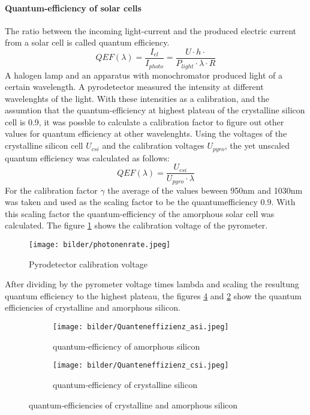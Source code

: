 \paragraph{Quantum-efficiency of solar cells}
The ratio between the incoming light-current and the produced
electric current from a solar cell is called quantum efficiency.
\begin{equation}
  QEF(\lambda) = \frac{I_{el}}{I_{photo}} = \frac{U\cdot h \cdot}{P_{light} \cdot \lambda \cdot R}
\end{equation}
A halogen lamp and an apparatus with monochromator produced light of a certain wavelength.
A pyrodetector measured the intensity at different wavelenghts of the light. With these intensities as
a calibration, and the assumtion that the quantum-efficiency
at highest plateau of the crystalline silicon cell is 0.9, it was possble to calculate a calibration factor
to figure out other values for quantum efficiency at other wavelenghts.
Using the voltages of the crystalline silicon cell $U_{csi}$ and the calibration voltages $U_{pyro}$, the yet unscaled quantum efficiency was calculated as follows:
\begin{equation}
  QEF(\lambda) = \frac{U_{csi}}{U_{pyro} \cdot \lambda}
  \label{}
\end{equation}
For the calibration factor $\gamma$ the average of the values beween 950nm and 1030nm was taken and used as the scaling factor to be the quantumefficiency 0.9.
With this scaling factor the quantum-efficiency of the amorphous solar cell was calculated.
The figure \ref{fig:pyro} shows the calibration voltage of the pyrometer.
\begin{figure}[h]
  \centering
  \texttt{[image: bilder/photonenrate.jpeg]}
  \caption{Pyrodetector calibration voltage}
  \label{fig:pyro}
\end{figure}
After dividing  by the pyrometer voltage times lambda and scaling the resultung quantum efficiency to the highest plateau, the figures \ref{fig:csi_qef} and \ref{fig:asi_qef} show
the quantum efficiencies of crystalline and amorphous silicon.
\begin{figure}[h]
  \centering
  \begin{subfigure}[b]{0.45\textwidth}
    \texttt{[image: bilder/Quanteneffizienz\_asi.jpeg]}
    \caption{quantum-efficiency of amorphous silicon}
    \label{fig:asi_qef}
  \end{subfigure}
  \begin{subfigure}[b]{0.45\textwidth}
    \texttt{[image: bilder/Quanteneffizienz\_csi.jpeg]}
    \caption{quantum-efficiency of crystalline silicon}
    \label{fig:csi_qef}
  \end{subfigure}
  \caption{quantum-efficiencies of crystalline and amorphous silicon}
\end{figure}
